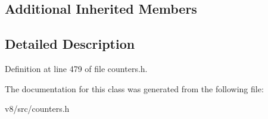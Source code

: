 \subsection*{Additional Inherited Members}


\subsection{Detailed Description}


Definition at line 479 of file counters.\+h.



The documentation for this class was generated from the following file\+:\begin{DoxyCompactItemize}
\item 
v8/src/counters.\+h\end{DoxyCompactItemize}
